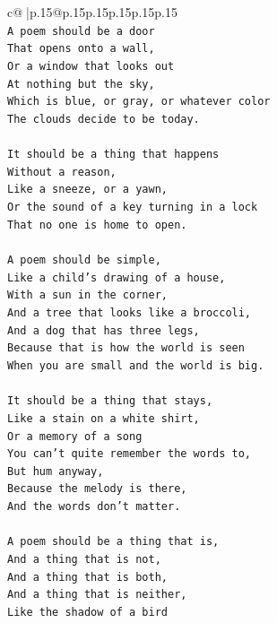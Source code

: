 \documentclass{article}
\begin{document}
{\begin{supertabular}{c@{$\;$}|p{.15\linewidth}@{}p{.15\linewidth}p{.15\linewidth}p{.15\linewidth}p{.15\linewidth}p{.15\linewidth}}
{{{\\ 
\texttt{A poem should be a door} \\
\texttt{That opens onto a wall,} \\
\texttt{Or a window that looks out} \\
\texttt{At nothing but the sky,} \\
\texttt{Which is blue, or gray, or whatever color} \\
\texttt{The clouds decide to be today.} \\
\\ 
\texttt{It should be a thing that happens} \\
\texttt{Without a reason,} \\
\texttt{Like a sneeze, or a yawn,} \\
\texttt{Or the sound of a key turning in a lock} \\
\texttt{That no one is home to open.} \\
\\ 
\texttt{A poem should be simple,} \\
\texttt{Like a child's drawing of a house,} \\
\texttt{With a sun in the corner,} \\
\texttt{And a tree that looks like a broccoli,} \\
\texttt{And a dog that has three legs,} \\
\texttt{Because that is how the world is seen} \\
\texttt{When you are small and the world is big.} \\
\\ 
\texttt{It should be a thing that stays,} \\
\texttt{Like a stain on a white shirt,} \\
\texttt{Or a memory of a song} \\
\texttt{You can't quite remember the words to,} \\
\texttt{But hum anyway,} \\
\texttt{Because the melody is there,} \\
\texttt{And the words don't matter.} \\
\\ 
\texttt{A poem should be a thing that is,} \\
\texttt{And a thing that is not,} \\
\texttt{And a thing that is both,} \\
\texttt{And a thing that is neither,} \\
\texttt{Like the shadow of a bird} \\
}}}
\end{supertabular}}
\end{document}
